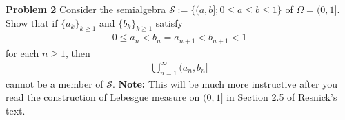 \documentclass{article}
\begin{document}
 \setcounter{page}{2}

\vspace{3 mm}

\noindent \textbf{Problem 2} Consider the semialgebra $\mathcal{S} := \{(a,b]; 0 \leq a \leq b \leq 1\}$ of $\Omega = (0,1]$.  Show that if $\{a_{k}\}_{k \geq 1}$ and $\{b_{k}\}_{k \geq 1}$ satisfy
\begin{eqnarray*} 0 \leq a_{n} < b_{n} = a_{n+1} < b_{n+1} < 1 \end{eqnarray*} for each $n \geq 1$, then
\begin{eqnarray*} \bigcup_{n=1}^{\infty}(a_{n}, b_{n}] \end{eqnarray*} cannot be a member of $\mathcal{S}$.  \textbf{Note:} This will be much more instructive after you read the construction of Lebesgue measure on $(0,1]$ in Section 2.5 of Resnick's text.
\end{document}
